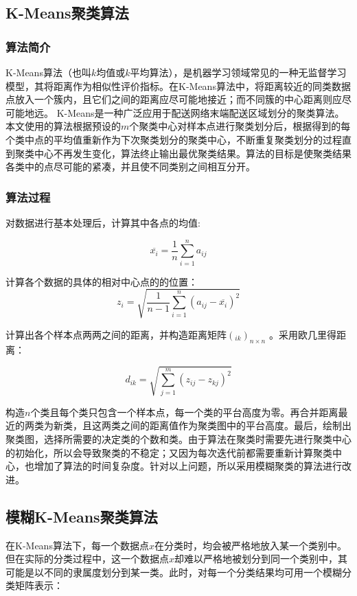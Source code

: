 \subsection{\rm{K-Means}聚类算法}
\subsubsection{算法简介}
\par K-Means算法（也叫$k$均值或$k$平均算法），是机器学习领域常见的一种无监督学习模型，其将距离作为相似性评价指标。在K-Means算法中，将距离较近的同类数据点放入一个簇内，且它们之间的距离应尽可能地接近；而不同簇的中心距离则应尽可能地远。
K-Means是一种广泛应用于配送网络末端配送区域划分的聚类算法。本文使用的算法根据预设的$m$个聚类中心对样本点进行聚类划分后，根据得到的每个类中点的平均值重新作为下次聚类划分的聚类中心，不断重复聚类划分的过程直到聚类中心不再发生变化，算法终止输出最优聚类结果。算法的目标是使聚类结果各类中的点尽可能的紧凑，并且使不同类别之间相互分开。

\subsubsection{算法过程}
\par 对数据进行基本处理后，计算其中各点的均值:

\begin{equation}
    \overline{x_i} = \frac{1}{n}\sum_{i=1}^na_{ij}
\end{equation}
\par 计算各个数据的具体的相对中心点的的位置：
 \begin{equation}
    z_i=\sqrt{\frac{1}{n-1}\sum_{i=1}^n(a_{ij}-\overline{x_i})^2}
\end{equation}
\par 计算出各个样本点两两之间的距离，并构造距离矩阵$(_{ik})_{n \times n}$ 。采用欧几里得距离：
 
\begin{equation}
    d_{ik} = \sqrt{\sum_{j=1}^m(z_{ij}-z_{kj})^2}
\end{equation}
\par 构造$n$个类且每个类只包含一个样本点，每一个类的平台高度为零。再合并距离最近的两类为新类，且这两类之间的距离值作为聚类图中的平台高度。最后，绘制出聚类图，选择所需要的决定类的个数和类。由于算法在聚类时需要先进行聚类中心的初始化，所以会导致聚类的不稳定；又因为每次迭代前都需要重新计算聚类中心，也增加了算法的时间复杂度。针对以上问题，所以采用模糊聚类的算法进行改进。

\subsection{模糊K-Means聚类算法}
\par 在K-Means算法下，每一个数据点$x$在分类时，均会被严格地放入某一个类别中。但在实际的分类过程中，这一个数据点$x$却难以严格地被划分到同一个类别中，其可能是以不同的隶属度划分到某一类。此时，对每一个分类结果均可用一个模糊分类矩阵表示：

